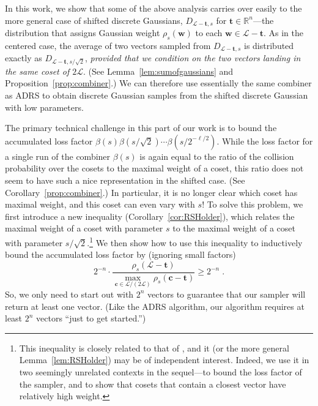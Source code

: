 \documentclass[11pt]{article}
\newcommand{\R}{\ensuremath{\mathbb{R}}}
\renewcommand{\vec}[1]{\ensuremath{\mathbf{#1}}}
\newcommand{\scarequotes}[1]{``#1''}
\newcommand{\lat}{\mathcal{L}}
\begin{document}
In this work, we show that some of the above analysis carries over easily to the more general case of shifted discrete Gaussians, $D_{\lat - \vec{t}, s}$ for $\vec{t} \in \R^n$---the distribution that assigns Gaussian weight $\rho_s(\vec{w})$ to each $\vec{w} \in \lat - \vec{t}$. As in the centered case, the average of two vectors sampled from $D_{\lat - \vec{t}, s}$ is distributed exactly as $D_{\lat - \vec{t}, s/\sqrt{2}}$, \emph{provided that we condition on the two vectors landing in the same coset of $2\lat$}. (See Lemma~\ref{lem:sumofgaussians} and Proposition~\ref{prop:combiner}.) We can therefore use essentially the same combiner as ADRS to obtain discrete Gaussian samples from the shifted discrete Gaussian with low parameters. 

The primary technical challenge in this part of our work is to bound the accumulated loss factor $\beta(s) \beta(s/\sqrt{2}) \cdots \beta(s/2^{-\ell/2})$. While the loss factor for a single run of the combiner $\beta(s)$ is again equal to the ratio of the collision probability over the cosets to the maximal weight of a coset, this ratio does not seem to have such a nice representation in the shifted case. (See Corollary~\ref{prop:combiner}.) In particular, it is no longer clear which coset has maximal weight, and this coset can even vary with $s$! To solve this problem, we first introduce a new inequality (Corollary~\ref{cor:RSHolder}), which relates the maximal weight of a coset with parameter $s$ to the maximal weight of a coset with parameter $s/\sqrt{2}$.\footnote{This inequality is closely related to that of \cite{RegevS15}, and it (or the more general Lemma~\ref{lem:RSHolder}) may be of independent interest. Indeed, we use it in two seemingly unrelated contexts in the sequel---to bound the loss factor of the sampler, and to show that cosets that contain a closest vector have relatively high weight.} We then show how to use this inequality to inductively bound the accumulated loss factor by (ignoring small factors)
\begin{equation}
\label{eq:intro_lossfactor}
2^{-n} \cdot \frac{\rho_s(\lat - \vec{t})}{\max_{\vec{c} \in \lat/(2\lat)} \rho_s(\vec{c} - \vec{t})} \geq 2^{-n}
\; .
\end{equation}
So, we only need to start out with $2^{n}$ vectors to guarantee that our sampler will return at least one vector. (Like the ADRS algorithm, our algorithm requires at least $2^n$ vectors \scarequotes{just to get started.})
\end{document}
